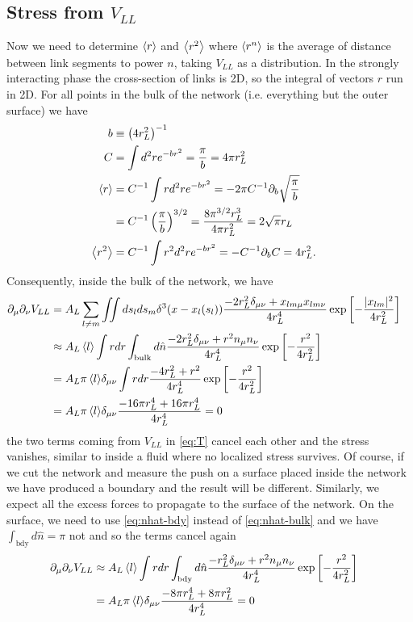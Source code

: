 \documentclass[nofootinbib,preprint,floatfix,titlepage,superscriptaddress]{revtex4} %
\begin{document}
\subsection{Stress from $V_{LL}$}
Now we need to determine $\left<r\right>$ and $\left<r^2\right>$ where $\left<r^n\right>$ is the average of distance between link segments to power $n$, taking $V_{LL}$ as a distribution. 
In the strongly interacting phase the %
cross-section of links is 2D, so the integral of vectors $r$ run in 2D. 
For all points in the bulk of the network (i.e. everything but the outer surface) we have
\begin{align}
b &\equiv \left(4r_L^2\right)^{-1}\cr
C &= \int d^2 r e^{-br^2} = {\pi\over b} = 4\pi r_L^2 \cr
\left<r\right> &= C^{-1}\int r d^2 r e^{-br^2} = - 2\pi C^{-1}\partial_b \sqrt{{\pi\over b}} \cr &= C^{-1} \left({\pi\over b}\right)^{3/2}    = {8\pi^{3/2} r_L^3\over 4 \pi r_L^2} = 2\sqrt{\pi} r_L \cr
\left<r^2\right> &= C^{-1}\int r^2 d^2 r e^{-b r^2} = - C^{-1}\partial_b C = 4r_L^2.
\end{align}
%
Consequently, inside the bulk of the network, we have 
\begin{align}
    \partial_\mu\partial_\nu V_{LL} & = A_L\sum_{l\ne m} \iint ds_l ds_m \delta^3(x-x_l(s_l))\frac{-2r_L^2\delta_{\mu\nu}+ x_{lm\mu} x_{lm\nu}}{4r_L^4}
    \exp\left[- {|x_{lm}|^2 \over 4 r_L^2}\right]\cr 
    & \approx {A_L\left<l\right>} \int r dr \int_\mathrm{bulk} d\hat{n} \frac{-2r_L^2\delta_{\mu\nu}+ r^2 n_\mu n_\nu}{4r_L^4}
    \exp\left[- {r^2 \over 4 r_L^2}\right]\cr
    &= {A_L\pi\left<l\right>} \delta_{\mu\nu} \int r dr  \frac{-4 r_L^2+ r^2 }{4r_L^4}
    \exp\left[- {r^2 \over 4 r_L^2}\right]\cr
    &= {A_L\pi\left<l\right>} \delta_{\mu\nu}  \frac{-16\pi r_L^4+ 16\pi r_L^4 }{4r_L^4} = 0 
    \label{eq:stress-bulk}
\end{align}
the two terms coming from $V_{LL}$ in \eqref{eq:T} cancel each other and the stress vanishes, similar to inside a fluid where no localized stress survives. 
Of course, if we cut the network and measure the push on a surface placed inside the network we have produced a boundary and the result will be different. 
Similarly, we expect all the excess forces to propagate to the surface of the network. 
On the surface, we need to use \eqref{eq:nhat-bdy}  instead of \eqref{eq:nhat-bulk} and we have $\int_\mathrm{bdy} d\hat{n} = \pi $ not and so the terms cancel again
\begin{align}
    \ro_\mu\ro_\nu V_{LL} 
    & \approx {A_L\be{l}} \int r dr \int_\mathrm{bdy} d\hat{n} \frac{-r_L^2\delta_{\mu\nu}+ r^2 n_\mu n_\nu}{4r_L^4}
    \exp\left[- {r^2 \over 4 r_L^2}\right]\cr
    &= {A_L\pi\be{l}} \delta_{\mu\nu}  \frac{-8\pi r_L^4+ 8\pi r_L^2 }{4r_L^4} =0%
    \label{eq:stress-bdy}
\end{align}
\end{document}

